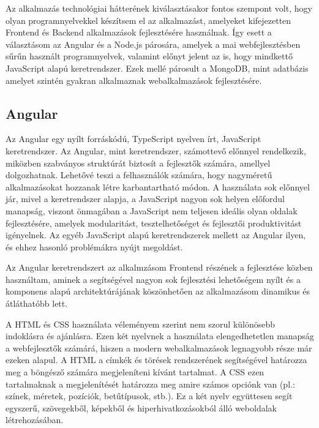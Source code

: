 Az alkalmazás technológiai hátterének kiválasztásakor fontos szempont volt, hogy olyan programnyelvekkel készítsem el az alkalmazást, amelyeket kifejezetten Frontend és Backend alkalmazások fejlesztésére használnak. Így esett a választásom az Angular és a Node.js párosára, amelyek a mai webfejlesztésben sűrűn használt programnyelvek, valamint előnyt jelent az is, hogy mindkettő JavaScript alapú keretrendszer. Ezek  mellé  párosult a MongoDB, mint adatbázis amelyet szintén gyakran alkalmaznak webalkalmazások fejlesztésére. 
\subsection{Angular}
Az Angular \cite{Angular1} egy nyílt forráskódú, TypeScript \cite{TypeScript} nyelven írt, JavaScript keretrendszer. Az Angular, mint keretrendszer, számottevő előnnyel rendelkezik, miközben szabványos struktúrát biztosít a fejlesztők számára, amellyel dolgozhatnak. Lehetővé teszi a felhasználók számára, hogy nagyméretű alkalmazásokat hozzanak létre karbantartható módon. A használata sok előnnyel jár, mivel a keretrendszer alapja, a JavaScript nagyon sok helyen előfordul manapság, viszont önmagában a JavaScript nem teljesen ideális olyan oldalak fejlesztésére, amelyek modularitást, tesztelhetőséget és fejlesztői produktivitást igényelnek. Az egyéb JavaScript alapú keretrendszerek mellett az Angular ilyen, és ehhez hasonló problémákra nyújt megoldást.

Az Angular keretrendszert az alkalmzásom Frontend részének a fejlesztése közben használtam, aminek a segítségével nagyon sok fejlesztési lehetőségem nyílt és a komponens alapú architektúrájának köszönhetően az alkalmazásom dinamikus és átláthatóbb lett.
\cite{Angular}\newline 

A HTML és CSS használata véleményem szerint nem szorul különösebb indoklásra és ajánlásra. Ezen két nyelvnek a használata elengedhetetlen manapság a webfejlesztők számárá, hiszen a modern webalkalmazások legnagyobb része már ezeken alapul. A HTML a címkék és törések rendszerének segítségével határozza meg a böngésző számára megjeleníteni kívánt tartalmat. A CSS ezen tartalmaknak a megjelenítését határozza meg amire számos opciónk van (pl.: színek, méretek, pozíciók, betűtípusok, stb.). Ez a két nyelv együttesen segít egyszerű, szövegekből, képekből és hiperhivatkozásokból álló weboldalak létrehozásában.
\cite{HTML}

